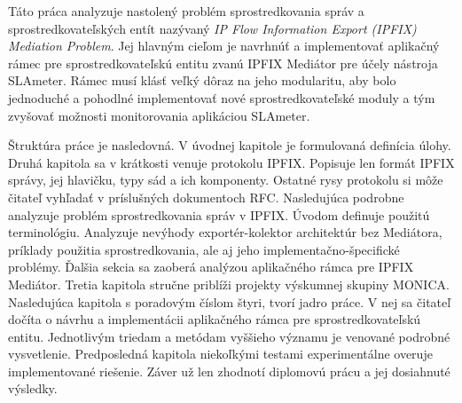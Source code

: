 Táto práca analyzuje nastolený problém sprostredkovania správ a sprostredkovateľských entít nazývaný 
\emph{IP Flow Information Export (IPFIX) Mediation Problem}. Jej hlavným cieľom je navrhnúť a implementovať
aplikačný rámec pre sprostredkovateľskú entitu zvanú IPFIX Mediátor pre účely nástroja SLAmeter. 
Rámec musí klásť veľký dôraz na jeho modularitu, aby bolo jednoduché a pohodlné implementovať nové 
sprostredkovateľské moduly a tým zvyšovať možnosti monitorovania aplikáciou SLAmeter.

Štruktúra práce je nasledovná. V úvodnej kapitole je formulovaná definícia úlohy. Druhá kapitola sa 
v krátkosti venuje protokolu IPFIX. Popisuje len formát IPFIX správy, jej hlavičku, typy
sád a ich komponenty. Ostatné rysy protokolu si môže čitateľ vyhľadať v príslušných dokumentoch RFC.
Nasledujúca podrobne analyzuje problém sprostredkovania správ v IPFIX. Úvodom definuje použitú 
terminológiu. Analyzuje nevýhody exportér-kolektor architektúr bez Mediátora, príklady použitia 
sprostredkovania, ale aj jeho implementačno-špecifické problémy. Ďalšia sekcia sa zaoberá analýzou 
aplikačného rámca pre IPFIX Mediátor. Tretia kapitola stručne priblíži projekty výskumnej skupiny MONICA.
Nasledujúca kapitola s poradovým číslom štyri, tvorí jadro práce. V nej sa čitateľ dočíta o návrhu a 
implementácii aplikačného rámca pre sprostredkovateľskú entitu. Jednotlivým triedam a metódam vyššieho 
významu je venované podrobné vysvetlenie. Predposledná kapitola niekoľkými testami experimentálne 
overuje implementované riešenie. Záver už len zhodnotí diplomovú prácu a jej dosiahnuté výsledky. 


